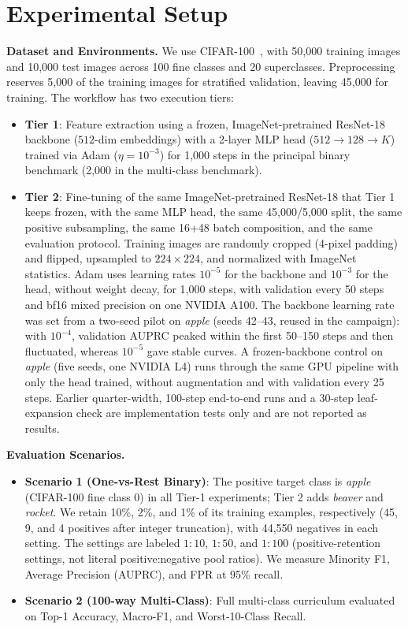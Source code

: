 \documentclass[11pt]{article}
\begin{document}
\section{Experimental Setup}
\label{sec:setup}

\textbf{Dataset and Environments.} We use CIFAR-100~\cite{krizhevsky2009learning}, with 50,000 training images and 10,000 test images across 100 fine classes and 20 superclasses. Preprocessing reserves 5,000 of the training images for stratified validation, leaving 45,000 for training. The workflow has two execution tiers:
\begin{itemize}
    \item \textbf{Tier 1}: Feature extraction using a frozen, ImageNet-pretrained ResNet-18~\cite{he2016deep} backbone ($512$-dim embeddings) with a 2-layer MLP head ($512 \rightarrow 128 \rightarrow K$) trained via Adam ($\eta = 10^{-3}$) for 1,000 steps in the principal binary benchmark (2,000 in the multi-class benchmark).
    \item \textbf{Tier 2}: Fine-tuning of the same ImageNet-pretrained ResNet-18 that Tier 1 keeps frozen, with the same MLP head, the same 45,000/5,000 split, the same positive subsampling, the same 16+48 batch composition, and the same evaluation protocol. Training images are randomly cropped (4-pixel padding) and flipped, upsampled to $224 \times 224$, and normalized with ImageNet statistics. Adam uses learning rates $10^{-5}$ for the backbone and $10^{-3}$ for the head, without weight decay, for 1,000 steps, with validation every 50 steps and bf16 mixed precision on one NVIDIA A100. The backbone learning rate was set from a two-seed pilot on \textit{apple} (seeds 42--43, reused in the campaign): with $10^{-4}$, validation AUPRC peaked within the first 50--150 steps and then fluctuated, whereas $10^{-5}$ gave stable curves. A frozen-backbone control on \textit{apple} (five seeds, one NVIDIA L4) runs through the same GPU pipeline with only the head trained, without augmentation and with validation every 25 steps. Earlier quarter-width, 100-step end-to-end runs and a 30-step leaf-expansion check are implementation tests only and are not reported as results.
\end{itemize}

\textbf{Evaluation Scenarios.}
\begin{itemize}
    \item \textbf{Scenario 1 (One-vs-Rest Binary)}: The positive target class is \textit{apple} (CIFAR-100 fine class 0) in all Tier-1 experiments; Tier 2 adds \textit{beaver} and \textit{rocket}. We retain 10\%, 2\%, and 1\% of its training examples, respectively (45, 9, and 4 positives after integer truncation), with 44,550 negatives in each setting. The settings are labeled $1{:}10$, $1{:}50$, and $1{:}100$ (positive-retention settings, not literal positive:negative pool ratios). We measure Minority F1, Average Precision (AUPRC), and FPR at 95\% recall.
    \item \textbf{Scenario 2 (100-way Multi-Class)}: Full multi-class curriculum evaluated on Top-1 Accuracy, Macro-F1, and Worst-10-Class Recall.
\end{itemize}
\end{document}
